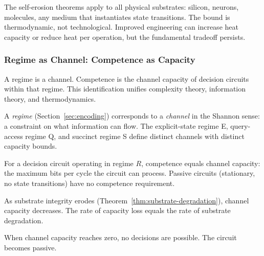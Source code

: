 \begin{remark}
The self-erosion theorems apply to all physical substrates: silicon, neurons, molecules, any medium that instantiates state transitions. The bound is thermodynamic, not technological. Improved engineering can increase heat capacity or reduce heat per operation, but the fundamental tradeoff persists.
\end{remark}

\subsubsection{Regime as Channel: Competence as Capacity}\label{sec:regime-channel}

A regime is a channel. Competence is the channel capacity of decision circuits within that regime. This identification unifies complexity theory, information theory, and thermodynamics.

\begin{definition}\label{def:regime-channel}
A \emph{regime} (Section~\ref{sec:encoding}) corresponds to a \emph{channel} in the Shannon sense: a constraint on what information can flow. The explicit-state regime E, query-access regime Q, and succinct regime S define distinct channels with distinct capacity bounds.
\end{definition}

\begin{theorem}\label{thm:competence-capacity}
For a decision circuit operating in regime $R$, competence equals channel capacity: the maximum bits per cycle the circuit can process. Passive circuits (stationary, no state transitions) have no competence requirement.
\end{theorem}

\begin{corollary}\label{cor:channel-degradation}
As substrate integrity erodes (Theorem~\ref{thm:substrate-degradation}), channel capacity decreases. The rate of capacity loss equals the rate of substrate degradation.
\end{corollary}

\begin{corollary}\label{cor:zero-capacity}
When channel capacity reaches zero, no decisions are possible. The circuit becomes passive.
\end{corollary}

